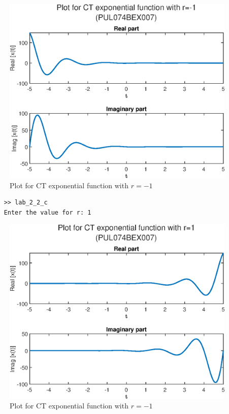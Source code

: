 \documentclass{lab_sheet}
\begin{document}
\begin{figure}[H]
    \centering
    \includegraphics[width=0.85\linewidth]{../Figures/lab_2_2_c_-1.eps}
    \caption{Plot for CT exponential function with $r=-1$}
    \label{fig:2_2_c_-1}
\end{figure}
\pagebreak
\begin{verbatim}
    >> lab_2_2_c
    Enter the value for r: 1
\end{verbatim}

\begin{figure}[H]
    \centering
    \includegraphics[width=0.85\linewidth]{../Figures/lab_2_2_c_1.eps}
    \caption{Plot for CT exponential function with $r=-1$}
    \label{fig:2_2_c_1}
\end{figure}
\end{document}
